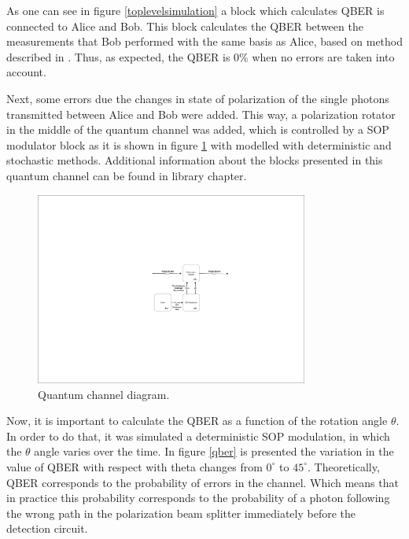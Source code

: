 \begin{refsection}
As one can see in figure \ref{toplevelsimulation} a block which calculates QBER is connected to Alice and Bob. This block calculates the QBER between the measurements that Bob performed with the same basis as Alice, based on method described in \cite{Muga11}. Thus, as expected, the QBER is $0 \%$ when no errors are taken into account.

Next, some errors due the changes in state of polarization of the single photons transmitted between Alice and Bob were added. This way, a polarization rotator in the middle of the quantum channel was added, which is controlled by a SOP modulator block as it is shown in figure \ref{sop_channel} with modelled with deterministic \cite{Muga15} and stochastic \cite{Czegledi16} methods. Additional information about the blocks presented in this quantum channel can be found in library chapter.

\begin{figure}[h]
    \centering
        \includegraphics[clip, trim=9cm 7.0cm 5cm 7.5cm, width=0.80\textwidth]{./sdf/bb84_with_discrete_variables/figures/Simulation_sop.pdf}
    \caption{Quantum channel diagram. }\label{sop_channel}
\end{figure}

Now, it is important to calculate the QBER as a function of the rotation angle $\theta$. In order to do that, it was simulated a deterministic SOP modulation, in which the $\theta$ angle varies over the time. In figure \ref{qber} is presented the variation in the value of QBER with respect with theta changes from $0^\circ$ to $45^\circ$. Theoretically, QBER corresponds to the probability of errors in the channel. Which means that in practice this probability corresponds to the probability of a photon following the wrong path in the polarization beam splitter immediately before the detection circuit.


\end{refsection}
